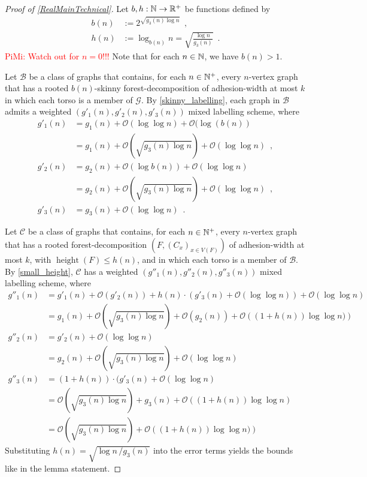 \documentclass{patmorin}
\renewcommand{\leq}{\leqslant}
\newcommand{\piotr}[1]{\noindent\textcolor{red}{PiMi: #1}}
\DeclareMathOperator{\height}{height}
\newcommand{\Oh}{\mathcal{O}}
\begin{document}
  \begin{proof}[Proof of \cref{RealMainTechnical}]
    Let $b,h:\mathbb{N}\to\mathbb{R}^+$ be functions defined by
    \begin{align*}
      b(n) &:=2^{\sqrt{g_3(n)\log n}}\enspace,\\
      h(n) &:= \log_{b(n)}n = \sqrt{\frac{\log n}{g_3(n)}} \enspace .
    \end{align*}
    \piotr{Watch out for $n=0$!!!}
    Note that for each $n\in\mathbb{N}$, we have $b(n)>1$.


    Let $\mathcal{B}$ be a class of graphs that contains, for each $n\in\mathbb{N}^+$, every $n$-vertex graph that has a rooted $b(n)$-skinny forest-decomposition of adhesion-width at most $k$ in which each torso is a member of $\mathcal{G}$.
    By \cref{skinny_labelling}, each graph in $\mathcal{B}$ admits a
    weighted $(g'_1(n),g'_2(n),g'_3(n))$ mixed labelling scheme, where
    \begin{align*}
     g'_1(n) & = g_1(n) + \Oh(\log\log n) + \Oh(\log(b(n))\\
     & = g_1(n) + \Oh\left(\sqrt{g_3(n) \log n}\right) + \Oh(\log\log n)\enspace, \\
     g'_2(n) & = g_2(n)+ \Oh(\log b(n))+\Oh(\log\log n)\\
          & = g_2(n) + \Oh\left(\sqrt{g_3(n) \log n}\right) + \Oh(\log\log n)\enspace, \\
     g'_3(n) & = g_3(n) + \Oh(\log\log n)\enspace.
    \end{align*}

    Let $\mathcal{C}$ be a class of graphs that contains, for each $n\in\mathbb{N}^+$,
    every $n$-vertex graph that has a rooted forest-decomposition $(F,(C_x)_{x\in V(F)})$
    of adhesion-width at most $k$, with $\height(F)\leq h(n)$, and
    in which each torso is a member of $\mathcal{B}$.
    By \cref{small_height}, $\mathcal{C}$ has a weighted $(g''_1(n),g''_2(n),g''_3(n))$ mixed labelling scheme, where
    \begin{align*}
     g''_1(n) & = g'_1(n) + \Oh(g'_2(n)) + h(n)\cdot (g'_3(n)+\Oh(\log\log n)) + \Oh(\log\log n) \\
       & = g_1(n) +  \Oh\left(\sqrt{g_3(n) \log n}\right) + \Oh(g_2(n)) + \Oh\left((1+h(n))\log\log n)\right) \\
     g''_2(n) & = g'_2(n) + \Oh(\log\log n) \\
       & = g_2(n) + \Oh\left(\sqrt{{g_3(n)\log n}}\right) + \Oh(\log\log n) \\
     g''_3(n) & = (1+h(n))\cdot (g'_3(n)+\Oh(\log\log n)\\%
       & = \Oh\left(\sqrt{g_3(n)\log n}\right) + g_3(n) + \Oh\left((1+h(n))\log\log n\right) \\
       & = \Oh\left(\sqrt{g_3(n) \log n}\right) + \Oh\left((1+h(n))\log\log n)\right)
   \end{align*}
   Substituting $h(n) = \sqrt{\log n\, / g_3(n)}$ into the error terms yields the bounds like in the lemma statement.


\end{proof}
\end{document}
